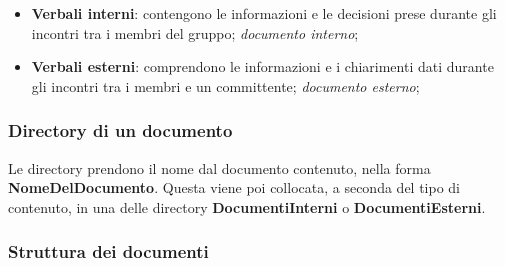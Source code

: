 \begin{itemize}
\begin{itemize}
		\item \textbf{Verbali interni}: contengono le informazioni e le decisioni prese durante gli incontri tra i membri del gruppo; \textit{documento interno};
		\item \textbf{Verbali esterni}: comprendono le informazioni e i chiarimenti dati durante gli incontri tra i membri e un committente; \textit{documento esterno};
	\end{itemize}
\end{itemize}

\subsubsection{Directory di un documento}

Le directory prendono il nome dal documento contenuto, nella forma \textbf{NomeDelDocumento}.  Questa viene poi collocata,  a seconda del tipo di contenuto,  in una delle directory \textbf{DocumentiInterni} o \textbf{DocumentiEsterni}. 

\subsubsection{Struttura dei documenti}

